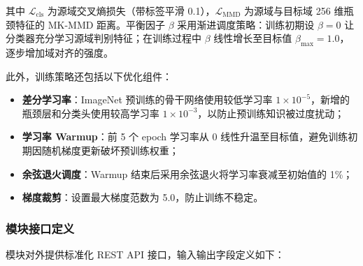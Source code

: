 \documentclass[UTF8, a4paper, 12pt]{ctexart}
\begin{document}
其中 $\mathcal{L}_{\mathrm{cls}}$ 为源域交叉熵损失（带标签平滑 0.1），$\mathcal{L}_{\mathrm{MMD}}$ 为源域与目标域 256 维瓶颈特征的 MK-MMD 距离。平衡因子 $\beta$ 采用渐进调度策略：训练初期设 $\beta = 0$ 让分类器充分学习源域判别特征；在训练过程中 $\beta$ 线性增长至目标值 $\beta_{\max} = 1.0$，逐步增加域对齐的强度。

此外，训练策略还包括以下优化组件：

\begin{itemize}
 \item \textbf{差分学习率}：ImageNet 预训练的骨干网络使用较低学习率 $1 \times 10^{-5}$，新增的瓶颈层和分类头使用较高学习率 $1 \times 10^{-3}$，以防止预训练知识被过度扰动；
 \item \textbf{学习率 Warmup}：前 5 个 epoch 学习率从 0 线性升温至目标值，避免训练初期因随机梯度更新破坏预训练权重；
 \item \textbf{余弦退火调度}：Warmup 结束后采用余弦退火将学习率衰减至初始值的 1\%；
 \item \textbf{梯度裁剪}：设置最大梯度范数为 5.0，防止训练不稳定。
\end{itemize}

\subsubsection{模块接口定义}

模块对外提供标准化 REST API 接口，输入输出字段定义如下：
\end{document}
